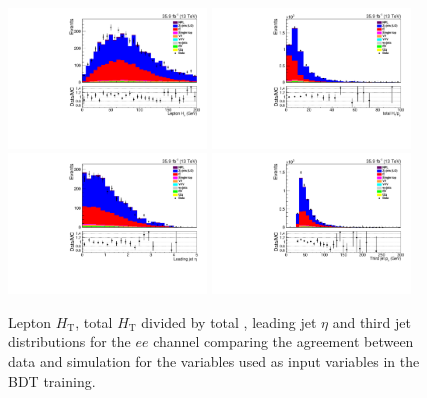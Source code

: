 \begin{figure}[h]
\centering
\includegraphics[width=0.47\textwidth]{figs/background-estimation/plots/unblinded/prompt_ee_ttbarInc/lepHt_NPL_ee_wMass_ee.pdf}
\includegraphics[width=0.47\textwidth]{figs/background-estimation/plots/unblinded/prompt_ee_ttbarInc/totHtOverPt_NPL_ee_wMass_ee.pdf}
\\
\includegraphics[width=0.47\textwidth]{figs/background-estimation/plots/unblinded/prompt_ee_ttbarInc/leadingJetEta_NPL_ee_wMass_ee.pdf}
\includegraphics[width=0.47\textwidth]{figs/background-estimation/plots/unblinded/prompt_ee_ttbarInc/thirdJetPt_NPL_ee_wMass_ee.pdf}
\caption{
Lepton ${\ensuremath{H_{\mathrm{T}}}}$, total ${\ensuremath{H_{\mathrm{T}}}}$ divided by total \pt, leading jet $\eta$ and third jet \pT distributions for the $ee$ channel comparing the agreement between data and simulation for the variables used as input variables in the BDT training.}
\label{fig:inputFeaturesDataSimAgreement3}
\end{figure}

